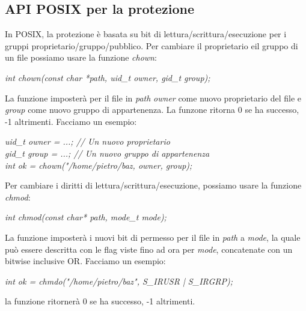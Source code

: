 \documentclass[12pt]{article}
\begin{document}
\subsection{API POSIX per la protezione}
In POSIX, la protezione è basata su bit di lettura/scrittura/esecuzione per i gruppi proprietario/gruppo/pubblico.
Per cambiare il proprietario eil gruppo di un file possiamo usare la funzione \textit{chown}:
\begin{center}
    \textit{int chown(const char *path, uid\_t owner, gid\_t group);}
\end{center}
La funzione imposterà per il file in \textit{path} \textit{owner} come nuovo proprietario del file e \textit{group} come nuovo gruppo di appartenenza.
La funzone ritorna 0 se ha successo, -1 altrimenti.
Facciamo un esempio:
\begin{center}
    \textit{uid\_t owner = ...; // Un nuovo proprietario} \\
    \textit{gid\_t group = ...; // Un nuovo gruppo di appartenenza} \\
    \textit{int ok = chown("/home/pietro/baz, owner, group);}
\end{center}
Per cambiare i diritti di lettura/scrittura/esecuzione, possiamo usare la funzione \textit{chmod}:
\begin{center}
    \textit{int chmod(const char* path, mode\_t mode);}
\end{center}
La funzione imposterà i nuovi bit di permesso per il file in \textit{path} a \textit{mode}, la quale può essere
descritta con le flag viste fino ad ora per \textit{mode}, concatenate con un bitwise inclusive OR. Facciamo un esempio:
\begin{center}
    \textit{int ok = chmdo("/home/pietro/baz", S\_IRUSR | S\_IRGRP);}
\end{center}
la funzione ritornerà 0 se ha successo, -1 altrimenti.
\end{document}
